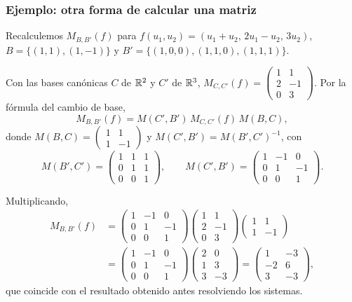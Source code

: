 \begin{frame}[allowframebreaks, t]
    \frametitle{Ejemplo: otra forma de calcular una matriz}

    \begin{example}
        Recalculemos $M_{B,B'}(f)$ para
        $f(u_1,u_2)=(u_1+u_2,\,2u_1-u_2,\,3u_2)$,
        $B=\{(1,1),(1,-1)\}$ y $B'=\{(1,0,0),(1,1,0),(1,1,1)\}$.
    \end{example}

    Con las bases canónicas $C$ de $\mathbb{R}^2$ y $C'$ de $\mathbb{R}^3$,
    $M_{C,C'}(f)=\begin{pmatrix}1&1\\2&-1\\0&3\end{pmatrix}$. Por la
    fórmula del cambio de base,
    \[
        M_{B,B'}(f)=M(C',B')\,M_{C,C'}(f)\,M(B,C),
    \]
    donde $M(B,C)=\begin{pmatrix}1&1\\1&-1\end{pmatrix}$ y
    $M(C',B')=M(B',C')^{-1}$, con
    \[
        M(B',C')=\begin{pmatrix}1&1&1\\0&1&1\\0&0&1\end{pmatrix},
        \qquad
        M(C',B')=\begin{pmatrix}1&-1&0\\0&1&-1\\0&0&1\end{pmatrix}.
    \]

    \framebreak

    Multiplicando,
    \begin{align*}
        M_{B,B'}(f)&=
        \begin{pmatrix}1&-1&0\\0&1&-1\\0&0&1\end{pmatrix}
        \begin{pmatrix}1&1\\2&-1\\0&3\end{pmatrix}
        \begin{pmatrix}1&1\\1&-1\end{pmatrix}\\
        &=
        \begin{pmatrix}1&-1&0\\0&1&-1\\0&0&1\end{pmatrix}
        \begin{pmatrix}2&0\\1&3\\3&-3\end{pmatrix}
        =
        \begin{pmatrix}1&-3\\-2&6\\3&-3\end{pmatrix},
    \end{align*}
    que coincide con el resultado obtenido antes resolviendo los sistemas.
\end{frame}


